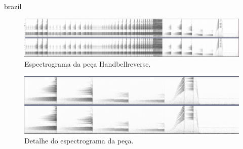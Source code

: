 \begin{otherlanguage*}{brazil}
\begin{figure}
\centering
\includegraphics[width=1\textwidth]{pictures/cap4/handbellreverse}
\caption{\label{handbell}Espectrograma da peça Handbellreverse.}
\label{fig:handbell}
\end{figure}








\begin{figure}
\centering
\includegraphics[width=1\textwidth]{pictures/cap4/handbellreverse_detail}
\caption{\label{handbelldt}Detalhe do espectrograma da peça.}
\label{fig:handbelldt}
\end{figure}



\end{otherlanguage*}

